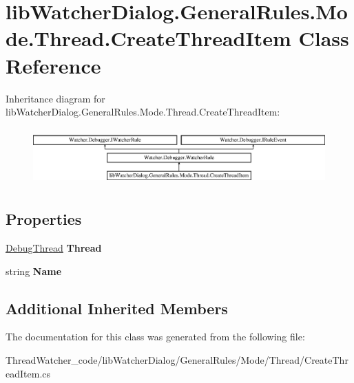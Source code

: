 \hypertarget{classlib_watcher_dialog_1_1_general_rules_1_1_mode_1_1_thread_1_1_create_thread_item}{\section{lib\+Watcher\+Dialog.\+General\+Rules.\+Mode.\+Thread.\+Create\+Thread\+Item Class Reference}
\label{classlib_watcher_dialog_1_1_general_rules_1_1_mode_1_1_thread_1_1_create_thread_item}
}
Inheritance diagram for lib\+Watcher\+Dialog.\+General\+Rules.\+Mode.\+Thread.\+Create\+Thread\+Item\+:\begin{figure}[H]
\begin{center}
\leavevmode
\includegraphics[height=2.210526cm]{classlib_watcher_dialog_1_1_general_rules_1_1_mode_1_1_thread_1_1_create_thread_item}
\end{center}
\end{figure}
\subsection*{Properties}
\begin{DoxyCompactItemize}
\item 
\hypertarget{classlib_watcher_dialog_1_1_general_rules_1_1_mode_1_1_thread_1_1_create_thread_item_ad87140efdf9dbaa814d61265dab72749}{\hyperlink{classlib_wather_debugger_1_1_thread_1_1_debug_thread}{Debug\+Thread} {\bfseries Thread}}\label{classlib_watcher_dialog_1_1_general_rules_1_1_mode_1_1_thread_1_1_create_thread_item_ad87140efdf9dbaa814d61265dab72749}

\item 
\hypertarget{classlib_watcher_dialog_1_1_general_rules_1_1_mode_1_1_thread_1_1_create_thread_item_aa110d9e7fdcf48ca3a00fa8f3827c97b}{string {\bfseries Name}}\label{classlib_watcher_dialog_1_1_general_rules_1_1_mode_1_1_thread_1_1_create_thread_item_aa110d9e7fdcf48ca3a00fa8f3827c97b}

\end{DoxyCompactItemize}
\subsection*{Additional Inherited Members}


The documentation for this class was generated from the following file\+:\begin{DoxyCompactItemize}
\item 
Thread\+Watcher\+\_\+code/lib\+Watcher\+Dialog/\+General\+Rules/\+Mode/\+Thread/Create\+Thread\+Item.\+cs\end{DoxyCompactItemize}
